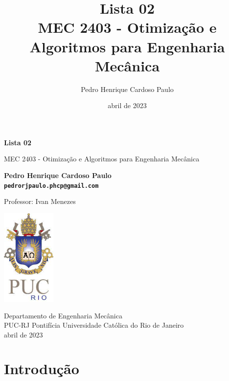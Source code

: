 \documentclass[10pt, a4paper]{article}
\begin{document}
\def\TITLE{Lista 02}
\def\DISCIPLINE{MEC 2403 - Otimização e Algoritmos para Engenharia Mecânica}
\def\PROFESSOR{Ivan Menezes}
\def\AUTHOR{Pedro Henrique Cardoso Paulo}
\def\CONTACT{pedrorjpaulo.phcp@gmail.com}
\def\DATE{abril de 2023}

\title{\textbf{\TITLE} \\ \DISCIPLINE}
\author{\AUTHOR}
\date{\DATE}

\begin{titlepage}
      \begin{center}
          \vspace*{1cm}

          \Huge
          \textbf{\TITLE}

          \vspace{0.5cm}
          \LARGE
          \DISCIPLINE

          \vspace{1.5cm}

          \textbf{\AUTHOR \\ {\tt \CONTACT}}

          \vfill
          Professor: \PROFESSOR

          \vspace{0.8cm}

          \includegraphics[width=0.2\textwidth]{../general/puc.jpg}

          \Large
          Departamento de Engenharia Mecânica\\
          PUC-RJ Pontifícia Universidade Católica do Rio de Janeiro\\
          \DATE

      \end{center}
  \end{titlepage}

\maketitle

\section{Introdução}
\end{document}
